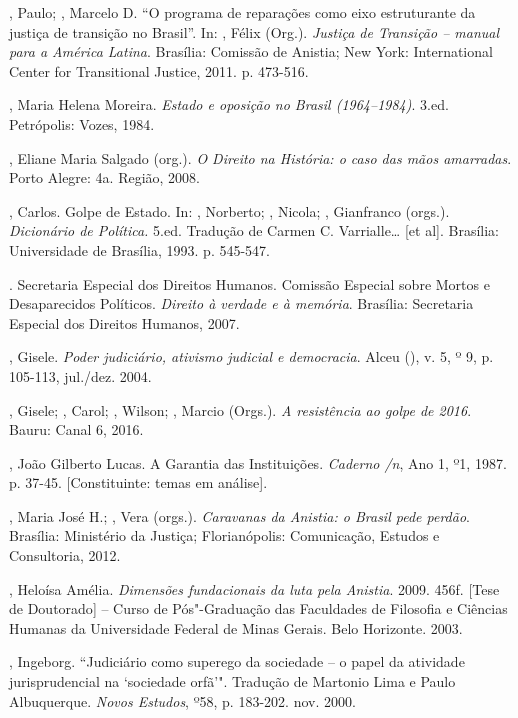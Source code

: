 \begin{Parskip}
, Paulo; , Marcelo D. ``O programa de reparações como eixo
estruturante da justiça de transição no Brasil''. In: , Félix
(Org.). \emph{Justiça de Transição -- manual para a América Latina}.
Brasília: Comissão de Anistia; New York: International Center for
Transitional Justice, 2011. p. 473-516.

, Maria Helena Moreira. \emph{Estado e oposição no Brasil
(1964--1984)}. 3.ed. Petrópolis: Vozes, 1984.

, Eliane Maria Salgado (org.). \emph{O Direito na História:
o caso das mãos amarradas}. Porto Alegre:  4a. Região, 2008.

, Carlos. Golpe de Estado. In: ,
Norberto; , Nicola;
, Gianfranco (orgs.). \emph{Dicionário de Política.} 5.ed.
Tradução de Carmen C. Varrialle\ldots{} {[}et al{]}. Brasília: Universidade
de Brasília, 1993. p. 545-547.

. Secretaria Especial dos Direitos Humanos. Comissão Especial
sobre Mortos e Desaparecidos Políticos. \emph{Direito à verdade e à
memória}. Brasília: Secretaria Especial dos Direitos Humanos, 2007.

, Gisele. \emph{Poder judiciário, ativismo judicial e
democracia}. Alceu (), v. 5, º 9, p. 105-113, jul./dez. 2004.

, Gisele; , Carol;  , Wilson; , Marcio
(Orgs.). \emph{A resistência ao golpe de 2016}. Bauru: Canal 6, 2016.

, João Gilberto Lucas. A Garantia das Instituições.
\emph{Caderno /n}, Ano 1, º1,
1987. p. 37-45. {[}Constituinte: temas em análise{]}.

, Maria José H.; , Vera (orgs.). \emph{Caravanas da
Anistia: o Brasil pede perdão}. Brasília: Ministério da Justiça;
Florianópolis: Comunicação, Estudos e Consultoria, 2012.

, Heloísa Amélia. \emph{Dimensões fundacionais da luta pela
Anistia}. 2009. 456f. {[}Tese de Doutorado{]} -- Curso de Pós"-Graduação
das Faculdades de Filosofia e Ciências Humanas da Universidade Federal
de Minas Gerais. Belo Horizonte. 2003.

, Ingeborg. ``Judiciário como superego da sociedade -- o papel da
atividade jurisprudencial na `sociedade orfã'". Tradução de Martonio Lima
e Paulo Albuquerque. \emph{Novos Estudos}, º58, p. 183-202. nov. 2000.


\end{Parskip}
